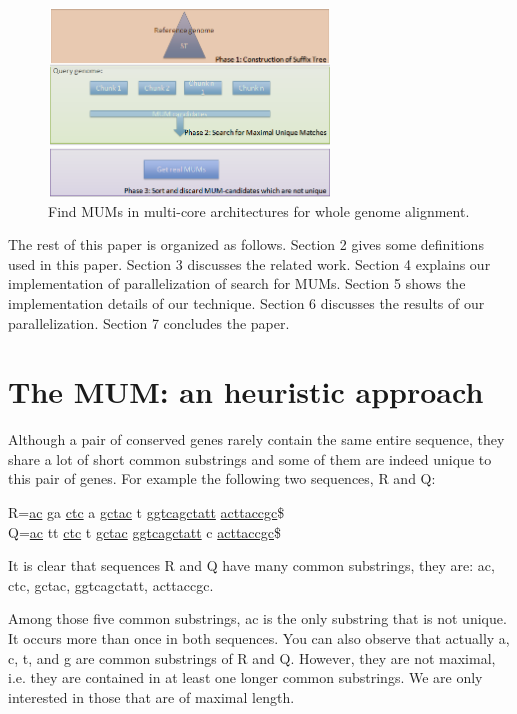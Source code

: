 \documentclass[conference]{IEEEtran}
\begin{document}
\begin{figure}[htb]   
\begin{center} 
  \includegraphics[width=7.5cm,height=5cm]{PhasesST.png}
\end{center} 
\caption{Find MUMs in multi-core architectures for whole genome alignment.} 
\label{algorithm} 
\end{figure} 

The rest of this paper is organized as follows. Section 2 gives some definitions used in this paper. Section 3 discusses the related work. Section 4 explains our implementation of parallelization of search for MUMs. Section 5 shows the implementation details of our technique. Section 6 discusses the results of our parallelization. Section 7 concludes the paper. 
\section{The  MUM: an heuristic approach}
Although a pair of conserved genes rarely contain the same entire sequence, they share a lot of short common substrings and some of them are indeed unique to this pair of genes. For example the following two sequences, R and Q:

\begin{center}
    R=\underline{ac} ga \underline{ctc} a \underline{gctac} t \underline{ggtcagctatt} \underline{acttaccgc}\$\\
    Q=\underline{ac} tt \underline{ctc} t \underline{gctac} \underline{ggtcagctatt} c \underline{acttaccgc}\$\\
\end{center}
    It is clear that sequences R and Q have many common substrings, they are: ac, ctc, gctac, ggtcagctatt, acttaccgc.
    
Among those five common substrings, ac is the only substring that is not unique. It occurs more than once in both sequences. You can also observe that actually a, c, t, and g are common substrings of R and Q. However, they are not maximal, i.e. they are contained in at least one longer common substrings. We are only interested in those that are of maximal length.
\end{document}
